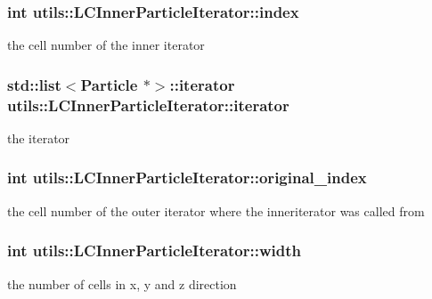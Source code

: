\hypertarget{classutils_1_1LCInnerParticleIterator_a27c807948fc9bfd2a30c94847530c39a}{
\subsubsection[{index}]{\setlength{\rightskip}{0pt plus 5cm}int utils\-::\-L\-C\-Inner\-Particle\-Iterator\-::index\hspace{0.3cm}{\ttfamily [private]}}}\label{classutils_1_1LCInnerParticleIterator_a27c807948fc9bfd2a30c94847530c39a}
the cell number of the inner iterator \hypertarget{classutils_1_1LCInnerParticleIterator_a556926724858f489ff82ba151748bd4d}{
\subsubsection[{iterator}]{\setlength{\rightskip}{0pt plus 5cm}std\-::list$<${\bf Particle} $\ast$$>$\-::iterator utils\-::\-L\-C\-Inner\-Particle\-Iterator\-::iterator\hspace{0.3cm}{\ttfamily [private]}}}\label{classutils_1_1LCInnerParticleIterator_a556926724858f489ff82ba151748bd4d}
the iterator \hypertarget{classutils_1_1LCInnerParticleIterator_a78f4884749444bd1ee25d874167dd582}{
\subsubsection[{original\-\_\-index}]{\setlength{\rightskip}{0pt plus 5cm}int utils\-::\-L\-C\-Inner\-Particle\-Iterator\-::original\-\_\-index\hspace{0.3cm}{\ttfamily [private]}}}\label{classutils_1_1LCInnerParticleIterator_a78f4884749444bd1ee25d874167dd582}
the cell number of the outer iterator where the inneriterator was called from \hypertarget{classutils_1_1LCInnerParticleIterator_a84770d6e782309bfc11ba2f965cb8f5c}{
\subsubsection[{width}]{\setlength{\rightskip}{0pt plus 5cm}int utils\-::\-L\-C\-Inner\-Particle\-Iterator\-::width\hspace{0.3cm}{\ttfamily [private]}}}\label{classutils_1_1LCInnerParticleIterator_a84770d6e782309bfc11ba2f965cb8f5c}
the number of cells in x, y and z direction 

